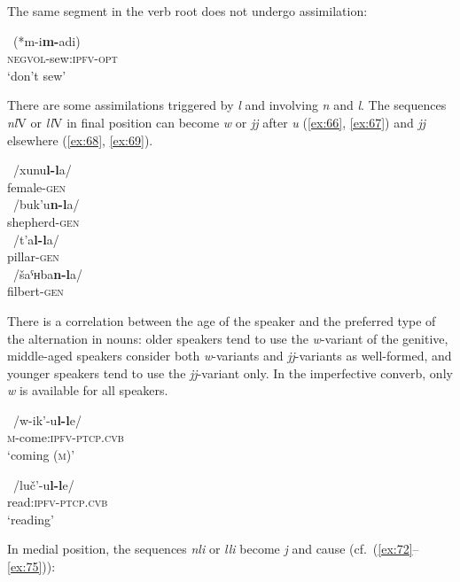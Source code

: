 \documentclass[output=paper]{langsci/langscibook}
\begin{document}
The same segment in the verb root does not undergo assimilation:

\ea \label{ex:65} %
~\textup{(*}{m-i\textbf{m-}adi}\textup{)}\\
\textsc{negvol}-sew:\textsc{ipfv}-\textsc{opt}\\
\glt `don't sew'
\z

There are some assimilations triggered by \emph{l} and involving
\emph{n} and \emph{l}. The sequences \emph{nl}V or \emph{ll}V in final
position can become \emph{w} or \emph{jj} after \emph{u} (\ref{ex:66}, \ref{ex:67}) and
\emph{jj} elsewhere (\ref{ex:68}, \ref{ex:69}).

\ea \label{ex:66} %
~/{xunu\textbf{l-l}a}/\\
female-\textsc{gen}\\

\ex \label{ex:67} %
~/{buk'u\textbf{n-l}a}/\\
shepherd-\textsc{gen}\\

\ex \label{ex:68} %
~/{t'a\textbf{l-l}a}/\\
pillar-\textsc{gen}\\

\ex \label{ex:69} %
~/{šaˤʜba\textbf{n-l}a}/\\
filbert-\textsc{gen}\\
\z

There is a correlation between the age of the speaker and the preferred
type of the alternation in nouns: older speakers tend to use the
\emph{w}-variant of the genitive, middle-aged speakers consider both
\emph{w}-variants and \emph{jj}-variants as well-formed, and younger
speakers tend to use the \emph{jj}-variant only. In the imperfective
converb, only \emph{w} is available for all speakers.

\ea \label{ex:70} %
~/{w-ik'-u\textbf{l-l}e}/\\
\textsc{m}-come:\textsc{ipfv}-\textsc{ptcp}.\textsc{cvb}\\
\glt `coming (\textsc{m})'

\ex \label{ex:71} %
~/{luč'-u\textbf{l-l}e}/\\
read:\textsc{ipfv}-\textsc{ptcp}.\textsc{cvb}\\
\glt `reading'
\z

In medial position, the sequences \emph{nli} or \emph{lli} become
\emph{j} and cause  (cf.\ (\ref{ex:72}–\ref{ex:75})):
\end{document}
